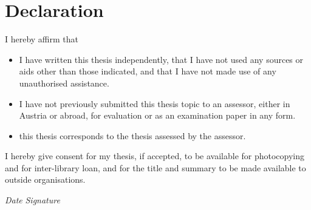 { 

\chapter*{Declaration}\label{sec:declaration}


I hereby affirm that


\begin{itemize}
	\item I have written this thesis independently, that I have not used any sources or aids other than those indicated, and that I have not made use of any unauthorised assistance.

	\item I have not previously submitted this thesis topic to an assessor, either in Austria or abroad, for evaluation or as an examination paper in any form.

	\item this thesis corresponds to the thesis assessed by the assessor.
\end{itemize}


I hereby give consent for my thesis, if accepted, to be available for photocopying and for inter-library loan, and for the title and summary to be made available to outside organisations.


\vfill

\setlength{\unitlength}{120pt}

\alinie{}\hfill{}\alinie{}

\textit{Date} \hfill \textit{Signature}

}
